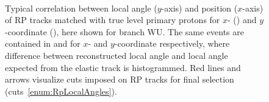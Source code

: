 \begin{figure}[b!]
{}%
\quad\quad%
\parbox{0.4725\textwidth}{
  \centering
  \begin{subfigure}[b]{\linewidth}\addtocounter{subfigure}{-2}
  \end{subfigure}\\
  \begin{subfigure}[b]{\linewidth}\addtocounter{subfigure}{1}
  \end{subfigure}
}%
\caption[Local angle vs. position of RP tracks matched with true level primary protons.]{Typical correlation between local angle ($y$-axis) and position ($x$-axis) of RP tracks matched with true level primary protons for $x$- () and $y$-coordinate (), here shown for branch WU. The same events are contained in  and  for $x$- and $y$-coordinate respectively, where difference between reconstructed local angle and local angle expected from the elastic track is histogrammed. Red lines and arrows visualize cuts imposed on RP tracks for final selection (cuts~\ref{enum:RpLocalAngles}).}\label{fig:localAngleRp}%
\end{figure}
